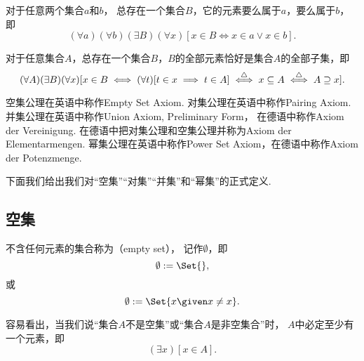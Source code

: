 \begin{axiom}[并集公理I]
对于任意两个集合\(a\)和\(b\)，
总存在一个集合\(B\)，它的元素要么属于\(a\)，要么属于\(b\)，即\begin{equation*}
	(\forall a)
	(\forall b)
	(\exists B)
	(\forall x)
	[
		x \in B
		\iff
		x \in a \lor x \in b
	].
\end{equation*}
\end{axiom}

\begin{axiom}[幂集公理]
对于任意集合\(A\)，总存在一个集合\(B\)，\(B\)的全部元素恰好是集合\(A\)的全部子集，即\begin{equation*}
	(\forall A)(\exists B)(\forall x)
	[
		x \in B
		\iff
		(\forall t)[t \in x \implies t \in A]
		\overset{\triangle}{\iff}
		x \subseteq A
		\overset{\triangle}{\iff}
		A \supseteq x
	].
\end{equation*}
\end{axiom}


空集公理在英语中称作Empty Set Axiom.
对集公理在英语中称作Pairing Axiom.
并集公理在英语中称作Union Axiom, Preliminary Form，
在德语中称作Axiom der Vereinigung.
在德语中把对集公理和空集公理并称为Axiom der Elementarmengen.
幂集公理在英语中称作Power Set Axiom，在德语中称作Axiom der Potenzmenge.

下面我们给出我们对“空集”“对集”“并集”和“幂集”的正式定义.

\subsection{空集}
\begin{definition}
不含任何元素的集合称为（empty set），
记作\(\emptyset\)，即
\begin{equation}
	\emptyset \defeq \Set{},
\end{equation}
或
\begin{equation}
	\emptyset \defeq \Set{ x \given x \neq x }.
\end{equation}
\end{definition}

容易看出，当我们说“集合\(A\)不是空集”或“集合\(A\)是非空集合”时，
\(A\)中必定至少有一个元素，即\begin{equation*}
	(\exists x)[x \in A].
\end{equation*}

